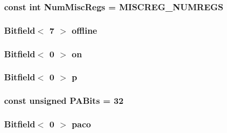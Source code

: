 \label{namespaceMipsISA_aa4755d292c82d3f9a290e04202de41de}
\hypertarget{namespaceMipsISA_a568d4aa96dd7cd963f3b1b1b0446c9c6}{
\subsubsection[{NumMiscRegs}]{\setlength{\rightskip}{0pt plus 5cm}const int {\bf NumMiscRegs} = MISCREG\_\-NUMREGS}}
\label{namespaceMipsISA_a568d4aa96dd7cd963f3b1b1b0446c9c6}
\hypertarget{namespaceMipsISA_a2049c9a70bdc8ee8d780d140564109d6}{
\subsubsection[{offline}]{\setlength{\rightskip}{0pt plus 5cm}Bitfield$<$ 7 $>$ {\bf offline}}}
\label{namespaceMipsISA_a2049c9a70bdc8ee8d780d140564109d6}
\hypertarget{namespaceMipsISA_a224bbd01abfc298b335097c93c0c7b99}{
\subsubsection[{on}]{\setlength{\rightskip}{0pt plus 5cm}Bitfield$<$ 0 $>$ {\bf on}}}
\label{namespaceMipsISA_a224bbd01abfc298b335097c93c0c7b99}
\hypertarget{namespaceMipsISA_a37d3f683959086eac7bcf24a002a9fb8}{
\subsubsection[{p}]{\setlength{\rightskip}{0pt plus 5cm}Bitfield$<$ 0 $>$ {\bf p}}}
\label{namespaceMipsISA_a37d3f683959086eac7bcf24a002a9fb8}
\hypertarget{namespaceMipsISA_a61386a9be90bc58024550fdbeb6ebaee}{
\subsubsection[{PABits}]{\setlength{\rightskip}{0pt plus 5cm}const unsigned {\bf PABits} = 32}}
\label{namespaceMipsISA_a61386a9be90bc58024550fdbeb6ebaee}
\hypertarget{namespaceMipsISA_a730eba39b1e25cb11460a3f90f49aa15}{
\subsubsection[{paco}]{\setlength{\rightskip}{0pt plus 5cm}Bitfield$<$ 0 $>$ {\bf paco}}}
